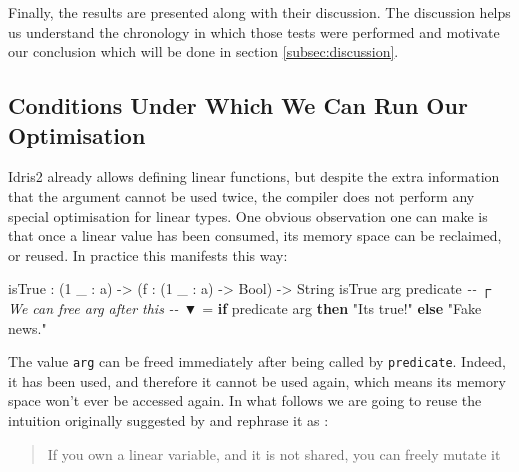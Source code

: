 \documentclass[
]{article}
\newenvironment{Shaded}{}{}
\newcommand{\CommentTok}[1]{\textcolor[rgb]{0.38,0.63,0.69}{\textit{#1}}}
\newcommand{\DataTypeTok}[1]{\textcolor[rgb]{0.56,0.13,0.00}{#1}}
\newcommand{\DecValTok}[1]{\textcolor[rgb]{0.25,0.63,0.44}{#1}}
\newcommand{\KeywordTok}[1]{\textcolor[rgb]{0.00,0.44,0.13}{\textbf{#1}}}
\newcommand{\NormalTok}[1]{#1}
\newcommand{\OperatorTok}[1]{\textcolor[rgb]{0.40,0.40,0.40}{#1}}
\newcommand{\OtherTok}[1]{\textcolor[rgb]{0.00,0.44,0.13}{#1}}
\newcommand{\StringTok}[1]{\textcolor[rgb]{0.25,0.44,0.63}{#1}}
\begin{document}
Finally, the results are presented along with their discussion. The
discussion helps us understand the chronology in which those tests were
performed and motivate our conclusion which will be done in section
\ref{subsec:discussion}.

\hypertarget{conditions-under-which-we-can-run-our-optimisation}{%
\subsection{Conditions Under Which We Can Run Our
Optimisation}\label{conditions-under-which-we-can-run-our-optimisation}}

Idris2 already allows defining linear functions, but despite the extra
information that the argument cannot be used twice, the compiler does
not perform any special optimisation for linear types. One obvious
observation one can make is that once a linear value has been consumed,
its memory space can be reclaimed, or reused. In practice this manifests
this way:

\begin{Shaded}
\begin{Highlighting}[]
\NormalTok{isTrue }\OperatorTok{:}\NormalTok{ (}\DecValTok{1}\NormalTok{ \_ }\OperatorTok{:}\NormalTok{ a) }\OtherTok{{-}\textgreater{}}\NormalTok{ (f }\OperatorTok{:}\NormalTok{ (}\DecValTok{1}\NormalTok{ \_ }\OperatorTok{:}\NormalTok{ a) }\OtherTok{{-}\textgreater{}} \DataTypeTok{Bool}\NormalTok{) }\OtherTok{{-}\textgreater{}} \DataTypeTok{String}
\NormalTok{isTrue arg predicate}
\CommentTok{{-}{-}                ┌ We can free \textasciigrave{}arg\textasciigrave{} after this}
\CommentTok{{-}{-}                ▼}
  \OtherTok{=} \KeywordTok{if}\NormalTok{ predicate arg }\KeywordTok{then} \StringTok{"It\textquotesingle{}s true!"}
                     \KeywordTok{else} \StringTok{"Fake news."}
\end{Highlighting}
\end{Shaded}

The value \texttt{arg} can be freed immediately after being called by
\texttt{predicate}. Indeed, it has been used, and therefore it cannot be
used again, which means its memory space won't ever be accessed again.
In what follows we are going to reuse the intuition originally suggested
by \cite{once_upon_a_type}\cite{linear_types_update}\cite{linear_use}
and rephrase it as :

\begin{quote}
If you own a linear variable, and it is not shared, you can freely
mutate it
\end{quote}
\end{document}
